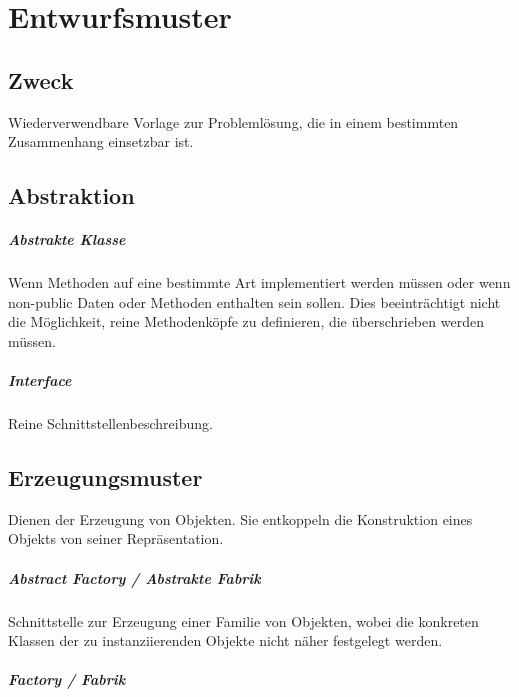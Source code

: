 {\let\clearpage\relax \chapter{Entwurfsmuster}\label{entwurfsmuster}}

\section{Zweck}\label{zweck}
Wiederverwendbare Vorlage zur Problemlösung, die in einem bestimmten
Zusammenhang einsetzbar ist.

\section{Abstraktion}\label{abstraktion}

\paragraph{Abstrakte Klasse}\label{abstrakte-klasse}

Wenn Methoden auf eine bestimmte Art implementiert werden müssen oder
wenn non-public Daten oder Methoden enthalten sein sollen. Dies
beeinträchtigt nicht die Möglichkeit, reine Methodenköpfe zu definieren,
die überschrieben werden müssen.

\paragraph{Interface}\label{interface}

Reine Schnittstellenbeschreibung.

\section{Erzeugungsmuster}\label{erzeugungsmuster}
Dienen der Erzeugung von Objekten. Sie entkoppeln die Konstruktion eines
Objekts von seiner Repräsentation.

\paragraph{Abstract Factory / Abstrakte Fabrik}\label{abstract-factory}

Schnittstelle zur Erzeugung einer Familie von Objekten, wobei die konkreten
Klassen der zu instanziierenden Objekte nicht näher festgelegt werden.

\paragraph{Factory / Fabrik}\label{factory}

